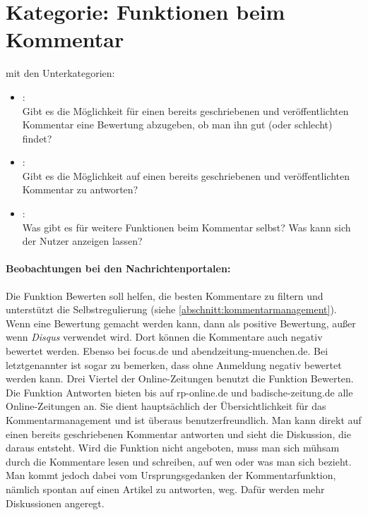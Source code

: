 \section{Kategorie: \glqq Funktionen beim Kommentar\grqq}

mit den Unterkategorien:
\begin{itemize}
\item{}\grqq:\\
Gibt es die Möglichkeit für einen bereits geschriebenen und veröffentlichten Kommentar eine Bewertung abzugeben, ob man ihn gut (oder schlecht) findet?

\item{}\grqq: \\
Gibt es die Möglichkeit auf einen bereits geschriebenen und veröffentlichten Kommentar zu antworten?


\item{}\grqq:\\
Was gibt es für weitere Funktionen beim Kommentar selbst? Was kann sich der Nutzer anzeigen lassen? 


\end{itemize}

\paragraph{Beobachtungen bei den Nachrichtenportalen:}

Die Funktion \glqq Bewerten\grqq \- soll helfen, die besten Kommentare zu
filtern und unterstützt die Selbstregulierung (siehe
\ref{abschnitt:kommentarmanagement}).  Wenn eine Bewertung gemacht werden kann,
dann als positive Bewertung, außer wenn  {\slshape Disqus} verwendet wird. Dort
können die Kommentare auch negativ bewertet werden. Ebenso bei focus.de und abendzeitung-muenchen.de. 
Bei letztgenannter ist sogar zu bemerken, dass ohne Anmeldung negativ bewertet werden kann. 
 Drei Viertel der Online-Zeitungen benutzt die Funktion \glqq Bewerten\grqq. \\ Die
Funktion \glqq Antworten\grqq{} bieten bis auf rp-online.de und
badische-zeitung.de alle Online-Zeitungen an.  Sie dient hauptsächlich der
Übersichtlichkeit für das Kommentarmanagement und ist überaus
benutzerfreundlich. Man kann direkt auf einen bereits geschriebenen Kommentar
antworten und sieht die Diskussion, die daraus entsteht.  Wird die Funktion
nicht angeboten, muss man sich mühsam durch die Kommentare lesen und schreiben,
auf wen oder was man sich bezieht.  Man kommt jedoch dabei vom Ursprungsgedanken
der Kommentarfunktion, nämlich spontan auf einen Artikel zu antworten, weg.
Dafür werden mehr Diskussionen angeregt.

